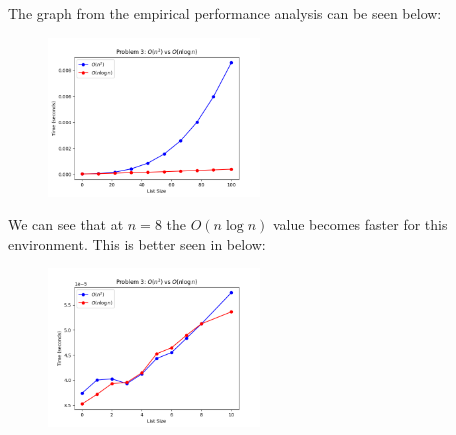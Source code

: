 \documentclass{hw}
\begin{document}
\begin{problem}
\begin{solution}
                The graph from the empirical performance analysis can be seen below:
                \begin{figure}[ht]
                  \centering
                      \includegraphics[width=0.5\textwidth]{figures/problem-3b.png}
                \end{figure}
                We can see that at $n=8$ the $O(n\log n)$ value becomes faster for this environment. This is better seen in below:
                \begin{figure}[ht]
                  \centering
                      \includegraphics[width=0.5\textwidth]{figures/problem-3a.png}
                \end{figure}
            
        \end{solution}
\end{problem}

\newpage
\end{document}
